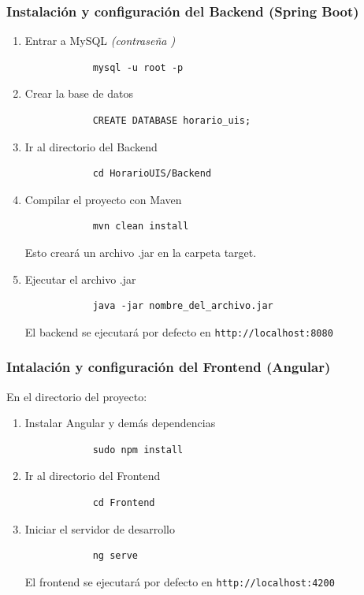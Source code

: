 \documentclass{article} %
\begin{document}
    \subsubsection{Instalación y configuración del Backend (Spring Boot)}
    \begin{enumerate}[font=\bfseries]
        \item Entrar a MySQL \textit{(contraseña \guillemotright)}
        \begin{verbatim}
            mysql -u root -p
        \end{verbatim}
        \item Crear la base de datos
        \begin{verbatim}
            CREATE DATABASE horario_uis;
        \end{verbatim}
        \item Ir al directorio del Backend
        \begin{verbatim}
            cd HorarioUIS/Backend
        \end{verbatim}
        \item Compilar el proyecto con Maven
        \begin{verbatim}
            mvn clean install
        \end{verbatim}
        Esto creará un archivo .jar en la carpeta target.
        \item Ejecutar el archivo .jar
        \begin{verbatim}
            java -jar nombre_del_archivo.jar
        \end{verbatim}
        El backend se ejecutará por defecto en \verb|http://localhost:8080|
    \end{enumerate}

    \subsubsection{Intalación y configuración del Frontend (Angular)}
    \noindent En el directorio del proyecto:
    \begin{enumerate}[font=\bfseries]
        \item Instalar Angular y demás dependencias
        \begin{verbatim}
            sudo npm install
        \end{verbatim}
        \item Ir al directorio del Frontend
        \begin{verbatim}
            cd Frontend
        \end{verbatim}
        \item Iniciar el servidor de desarrollo
        \begin{verbatim}
            ng serve
        \end{verbatim}
        El frontend se ejecutará por defecto en \verb|http://localhost:4200|
    \end{enumerate}
    
\end{document}
